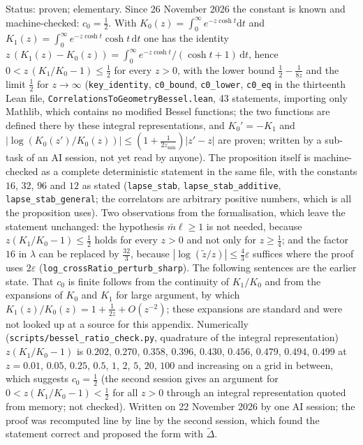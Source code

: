 \documentclass[11pt,a4paper]{article}
\theoremstyle{stmt}
\theoremstyle{defn}
\theoremstyle{rmk}
\numberwithin{equation}{section}
\newcommand{\status}[1]{\par\noindent\textsf{\small Status: #1}\par}
\newcommand{\dd}{\mathrm{d}}
\begin{document}
{\status{proven; elementary. Since 26 November 2026 the constant is known and machine-checked: $c_0=\frac12$. With $K_0(z)=\int_0^\infty e^{-z\cosh t}\dd t$ and $K_1(z)=\int_0^\infty e^{-z\cosh t}\cosh t\,\dd t$ one has the identity $z\,(K_1(z)-K_0(z))=\int_0^\infty e^{-z\cosh t}/(\cosh t+1)\,\dd t$, hence $0<z\,(K_1/K_0-1)\le\frac12$ for every $z>0$, with the lower bound $\frac12-\frac1{8z}$ and the limit $\frac12$ for $z\to\infty$ (\texttt{key\_identity}, \texttt{c0\_bound}, \texttt{c0\_lower}, \texttt{c0\_eq} in the thirteenth Lean file, \texttt{CorrelationsToGeometryBessel.lean}, 43 statements, importing only Mathlib, which contains no modified Bessel functions; the two functions are defined there by these integral representations, and $K_0'=-K_1$ and $|\log(K_0(z')/K_0(z))|\le(1+\frac1{2z_{\min}})|z'-z|$ are proven; written by a sub-task of an AI session, not yet read by anyone). The proposition itself is machine-checked as a complete deterministic statement in the same file, with the constants $16$, $32$, $96$ and $12$ as stated (\texttt{lapse\_stab}, \texttt{lapse\_stab\_additive}, \texttt{lapse\_stab\_general}; the correlators are arbitrary positive numbers, which is all the proposition uses). Two observations from the formalisation, which leave the statement unchanged: the hypothesis $\bar m\ell\ge1$ is not needed, because $z(K_1/K_0-1)\le\frac12$ holds for every $z>0$ and not only for $z\ge\frac14$; and the factor $16$ in $\lambda$ can be replaced by $\frac{32}3$, because $|\log(\tilde z/z)|\le\frac43\varepsilon$ suffices where the proof uses $2\varepsilon$ (\texttt{log\_crossRatio\_perturb\_sharp}). The following sentences are the earlier state. That $c_0$ is finite follows from the continuity of $K_1/K_0$ and from the expansions of $K_0$ and $K_1$ for large argument, by which $K_1(z)/K_0(z)=1+\frac1{2z}+O(z^{-2})$; these expansions are standard and were not looked up at a source for this appendix. Numerically (\texttt{scripts/bessel\_ratio\_check.py}, quadrature of the integral representation) $z(K_1/K_0-1)$ is $0.202$, $0.270$, $0.358$, $0.396$, $0.430$, $0.456$, $0.479$, $0.494$, $0.499$ at $z=0.01$, $0.05$, $0.25$, $0.5$, $1$, $2$, $5$, $20$, $100$ and increasing on a grid in between, which suggests $c_0=\frac12$ (the second session gives an argument for $0<z(K_1/K_0-1)<\frac12$ for all $z>0$ through an integral representation quoted from memory; not checked). Written on 22 November 2026 by one AI session; the proof was recomputed line by line by the second session, which found the statement correct and proposed the form with $\tilde\Delta$.}

}
\end{document}
